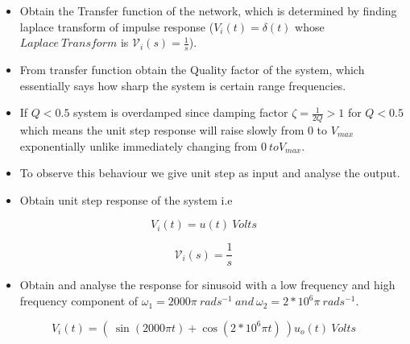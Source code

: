 \documentclass[11pt, a4paper]{article}
\begin{document}
\begin{itemize}
\item
  Obtain the Transfer function of the network, which is determined by
  finding laplace transform of impulse response
  (\(V_{i}(t) = \delta (t)\) whose \(Laplace \ Transform\) is
  \(\mathcal{V}_i(s) = \frac{1}{s}\)).
\item
  From transfer function obtain the Quality factor of the system, which
  essentially says how sharp the system is certain range frequencies.
\item
  If \(Q < 0.5\) system is overdamped since damping factor
  \(\zeta = \frac{1}{2Q} > 1\) for \(Q<0.5\) which means the unit step
  response will raise slowly from 0 to \(V_{max}\) exponentially unlike
  immediately changing from \(0 \ to V_{max}\).
\item
  To observe this behaviour we give unit step as input and analyse the
  output.
\item
  Obtain unit step response of the system i.e
\end{itemize}

\begin{equation}
V_{i}(t) = u(t) \ Volts
\end{equation}

\begin{equation}
\mathcal{V}_{i}(s) = \frac{1}{s}
\end{equation}

\begin{itemize}
\item
  Obtain and analyse the response for sinusoid with a low frequency and
  high frequency component of
  \(\omega_1 = 2000\pi \ rads^{-1} \ and \ \omega_2 = 2*10^{6}\pi \ rads^{-1}\).
\end{itemize}

\begin{equation}
V_{i}(t) = ( \ \sin(2000\pi t) + \cos(2*10^{6}\pi t) \ )u_{o}(t) \ Volts
\end{equation}
\end{document}

